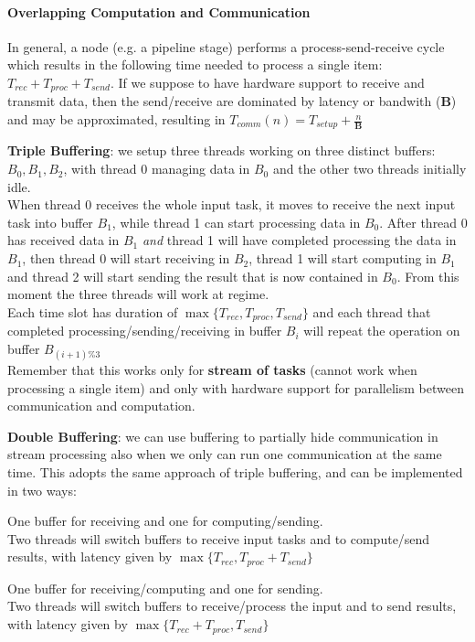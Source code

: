 \documentclass[10pt]{report}
\begin{document}
\paragraph{Overlapping Computation and Communication} In general, a node (e.g. a pipeline stage) performs a process-send-receive cycle which results in the following time needed to process a single item: $T_{rec} + T_{proc} + T_{send}$. If we suppose to have hardware support to receive and transmit data, then the send/receive are dominated by latency or bandwith ($\mathbf{B}$) and may be approximated, resulting in $T_{comm}(n) = T_{setup}+\frac{n}{\mathbf{B}}$
\begin{list}{}{}
	\item \textbf{Triple Buffering}: we setup three threads working on three distinct buffers: $B_0, B_1, B_2$, with thread 0 managing data in $B_0$ and the other two threads initially idle.\\
	When thread 0 receives the whole input task, it moves to receive the next input task into buffer $B_1$, while thread 1 can start processing data in $B_0$. After thread 0 has received data in $B_1$ \textit{and} thread 1 will have completed processing the data in $B_1$, then thread 0 will start receiving in $B_2$, thread 1 will start computing in $B_1$ and thread 2 will start sending the result that is now contained in $B_0$. From this moment the three threads will work at regime.\\
	Each time slot has duration of $\max\{T_{rec}, T_{proc}, T_{send}\}$ and each thread that completed processing/sending/receiving in buffer $B_i$ will repeat the operation on buffer $B_{(i+1)\%3}$\\
	Remember that this works only for \textbf{stream of tasks} (cannot work when processing a single item) and only with hardware support for parallelism between communication and computation.
	\item \textbf{Double Buffering}: we can use buffering to partially hide communication in stream processing also when we only can run one communication at the same time. This adopts the same approach of triple buffering, and can be implemented in two ways:
	\begin{list}{}{}
		\item One buffer for receiving and one for computing/sending.\\
		Two threads will switch buffers to receive input tasks and to compute/send results, with latency given by $\max\{T_{rec}, T_{proc}+T_{send}\}$
		\item One buffer for receiving/computing and one for sending.\\
		Two threads will switch buffers to receive/process the input and to send results, with latency given by $\max\{T_{rec}+T_{proc}, T_{send}\}$
	\end{list}
\end{list}
\end{document}
